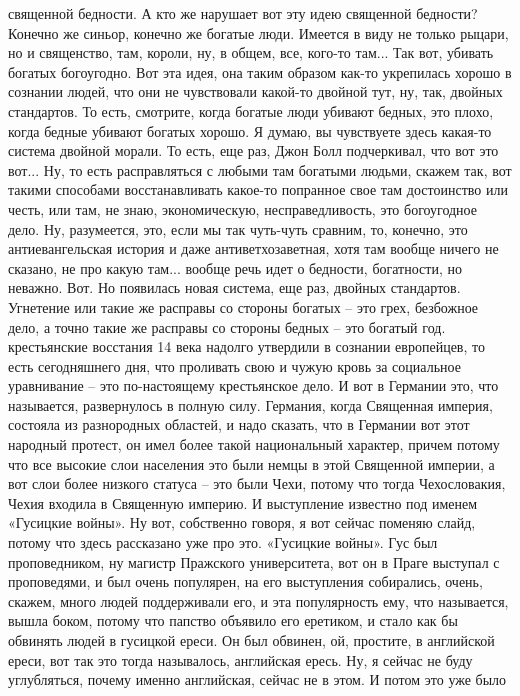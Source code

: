 священной бедности. А кто же нарушает вот эту идею священной бедности? Конечно
же синьор, конечно же богатые люди. Имеется в виду не только рыцари, но и
священство, там, короли, ну, в общем, все, кого-то там... Так вот, убивать
богатых богоугодно. Вот эта идея, она таким образом как-то укрепилась хорошо в
сознании людей, что они не чувствовали какой-то двойной тут, ну, так, двойных
стандартов. То есть, смотрите, когда богатые люди убивают бедных, это плохо,
когда бедные убивают богатых хорошо. Я думаю, вы чувствуете здесь какая-то
система двойной морали. То есть, еще раз, Джон Болл подчеркивал, что вот это
вот... Ну, то есть расправляться с любыми там богатыми людьми, скажем так, вот
такими способами восстанавливать какое-то попранное свое там достоинство или
честь, или там, не знаю, экономическую, несправедливость, это богоугодное дело.
Ну, разумеется, это, если мы так чуть-чуть сравним, то, конечно, это
антиевангельская история и даже антиветхозаветная, хотя там вообще ничего не
сказано, не про какую там... вообще речь идет о бедности, богатности, но
неважно. Вот. Но появилась новая система, еще раз, двойных стандартов. Угнетение
или такие же расправы со стороны богатых – это грех, безбожное дело, а точно
такие же расправы со стороны бедных – это богатый год. крестьянские восстания 14
века надолго утвердили в сознании европейцев, то есть сегодняшнего дня, что
проливать свою и чужую кровь за социальное уравнивание – это по-настоящему
крестьянское дело. И вот в Германии это, что называется, развернулось в полную
силу. Германия, когда Священная империя, состояла из разнородных областей, и
надо сказать, что в Германии вот этот народный протест, он имел более такой
национальный характер, причем потому что все высокие слои населения это были
немцы в этой Священной империи, а вот слои более низкого статуса – это были
Чехи, потому что тогда Чехословакия, Чехия входила в Священную империю. И
выступление известно под именем «Гусицкие войны». Ну вот, собственно говоря, я
вот сейчас поменяю слайд, потому что здесь рассказано уже про это. «Гусицкие
войны». Гус был проповедником, ну магистр Пражского университета, вот он в Праге
выступал с проповедями, и был очень популярен, на его выступления собирались,
очень, скажем, много людей поддерживали его, и эта популярность ему, что
называется, вышла боком, потому что папство объявило его еретиком, и стало как
бы обвинять людей в гусицкой ереси. Он был обвинен, ой, простите, в английской
ереси, вот так это тогда называлось, английская ересь. Ну, я сейчас не буду
углубляться, почему именно английская, сейчас не в этом. И потом это уже было
